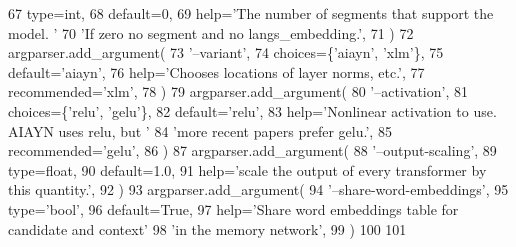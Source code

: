 \begin{DoxyCode}
67         type=int,
68         default=0,
69         help=\textcolor{stringliteral}{'The number of segments that support the model. '}
70         \textcolor{stringliteral}{'If zero no segment and no langs\_embedding.'},
71     )
72     argparser.add\_argument(
73         \textcolor{stringliteral}{'--variant'},
74         choices=\{\textcolor{stringliteral}{'aiayn'}, \textcolor{stringliteral}{'xlm'}\},
75         default=\textcolor{stringliteral}{'aiayn'},
76         help=\textcolor{stringliteral}{'Chooses locations of layer norms, etc.'},
77         recommended=\textcolor{stringliteral}{'xlm'},
78     )
79     argparser.add\_argument(
80         \textcolor{stringliteral}{'--activation'},
81         choices=\{\textcolor{stringliteral}{'relu'}, \textcolor{stringliteral}{'gelu'}\},
82         default=\textcolor{stringliteral}{'relu'},
83         help=\textcolor{stringliteral}{'Nonlinear activation to use. AIAYN uses relu, but '}
84         \textcolor{stringliteral}{'more recent papers prefer gelu.'},
85         recommended=\textcolor{stringliteral}{'gelu'},
86     )
87     argparser.add\_argument(
88         \textcolor{stringliteral}{'--output-scaling'},
89         type=float,
90         default=1.0,
91         help=\textcolor{stringliteral}{'scale the output of every transformer by this quantity.'},
92     )
93     argparser.add\_argument(
94         \textcolor{stringliteral}{'--share-word-embeddings'},
95         type=\textcolor{stringliteral}{'bool'},
96         default=\textcolor{keyword}{True},
97         help=\textcolor{stringliteral}{'Share word embeddings table for candidate and context'}
98         \textcolor{stringliteral}{'in the memory network'},
99     )
100 
101 
\end{DoxyCode}
